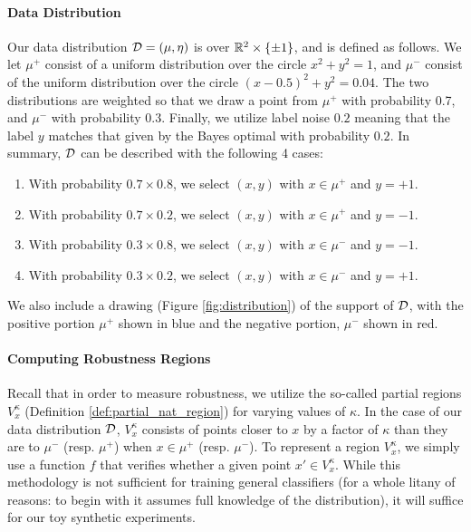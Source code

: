 \paragraph{Data Distribution} Our data distribution ${\mathcal D} = (\mu, \eta)$ is over $\mathbb R^2 \times \{\pm 1\}$, and is defined as follows. We let $\mu^+$ consist of a uniform distribution over the circle $x^2 + y^2 = 1$, and $\mu^-$ consist of the uniform distribution over the circle $(x-0.5)^2 + y^2 = 0.04$. The two distributions are weighted so that we draw a point from $\mu^+$ with probability 0.7, and $\mu^-$ with probability $0.3$. Finally, we utilize label noise $0.2$ meaning that the label $y$ matches that given by the Bayes optimal with probability $0.2$. In summary, ${\mathcal D}$ can be described with the following 4 cases:
\begin{enumerate}
	\item With probability $0.7 \times 0.8$, we select $(x,y)$ with $x \in \mu^+$ and $y = +1$.
	\item With probability $0.7 \times 0.2$, we select $(x,y)$ with $x \in \mu^+$ and $y = -1$. 
	\item With probability $0.3 \times 0.8$, we select $(x,y)$ with $x \in \mu^-$ and $y = -1$.
	\item With probability $0.3 \times 0.2$, we select $(x,y)$ with $x \in \mu^-$ and $y = +1$.
\end{enumerate}
We also include a drawing (Figure \ref{fig:distribution}) of the support of ${\mathcal D}$, with the positive portion $\mu^+$ shown in blue and the negative portion, $\mu^-$ shown in red. 

\paragraph{Computing Robustness Regions} 

Recall that in order to measure robustness, we utilize the so-called partial \natural\emph{ }regions $V_x^\kappa$ (Definition \ref{def:partial_nat_region}) for varying values of $\kappa$. In the case of our data distribution ${\mathcal D}$, $V_x^\kappa$ consists of points closer to $x$ by a factor of $\kappa$ than they are to $\mu^-$ (resp. $\mu^+$) when $x \in \mu^+$ (resp. $\mu^-$). To represent a region $V_x^\kappa$, we simply use a function $f$ that verifies whether a given point $x' \in V_x^\kappa$. While this methodology is not sufficient for training general classifiers (for a whole litany of reasons: to begin with it assumes full knowledge of the distribution), it will suffice for our toy synthetic experiments. 


